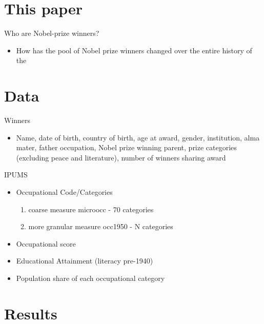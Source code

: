 \section{This paper}

\begin{frame}{Who are Nobel-prize winners?}
\begin{itemize}
    \item How has the pool of Nobel prize winners changed over the entire history of the 
\end{itemize}
\end{frame}

\section{Data}
\label{"waiting for reftex-label call..."}

\begin{frame}{Winners}
\begin{itemize}
    \item Name, date of birth, country of birth, age at award, gender, institution, alma mater, father occupation, Nobel prize winning parent, prize categories (excluding peace and literature), number of winners sharing award
\end{itemize}
\end{frame}

\begin{frame}{IPUMS}

  \begin{itemize}
  \item Occupational Code/Categories
    \begin{enumerate}
    \item coarse measure microocc - 70 categories
      \item more granular measure occ1950 - N categories
    \end{enumerate}
  \item Occupational score
  \item Educational Attainment (literacy pre-1940)
  \item Population share of each occupational category
  \end{itemize}
\end{frame}


\section{Results}
\label{"waiting for reftex-label call..."}

